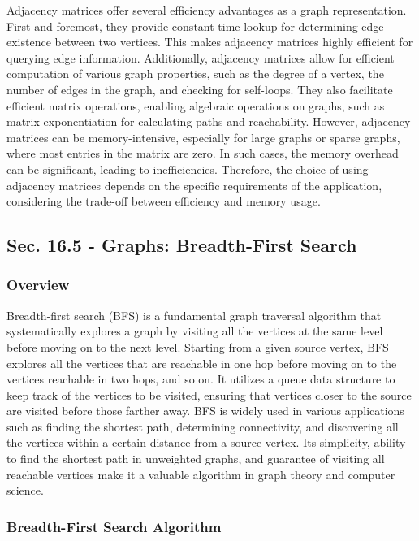 Adjacency matrices offer several efficiency advantages as a graph representation. First and foremost, they provide constant-time lookup for determining edge existence between two vertices. This makes adjacency matrices 
highly efficient for querying edge information. Additionally, adjacency matrices allow for efficient computation of various graph properties, such as the degree of a vertex, the number of edges in the graph, and checking 
for self-loops. They also facilitate efficient matrix operations, enabling algebraic operations on graphs, such as matrix exponentiation for calculating paths and reachability. However, adjacency matrices can be 
memory-intensive, especially for large graphs or sparse graphs, where most entries in the matrix are zero. In such cases, the memory overhead can be significant, leading to inefficiencies. Therefore, the choice of using 
adjacency matrices depends on the specific requirements of the application, considering the trade-off between efficiency and memory usage.

\subsection*{Sec. 16.5 - Graphs: Breadth-First Search}

\subsubsection{Overview}

Breadth-first search (BFS) is a fundamental graph traversal algorithm that systematically explores a graph by visiting all the vertices at the same level before moving on to the next level. Starting from a given source 
vertex, BFS explores all the vertices that are reachable in one hop before moving on to the vertices reachable in two hops, and so on. It utilizes a queue data structure to keep track of the vertices to be visited, ensuring 
that vertices closer to the source are visited before those farther away. BFS is widely used in various applications such as finding the shortest path, determining connectivity, and discovering all the vertices within a certain 
distance from a source vertex. Its simplicity, ability to find the shortest path in unweighted graphs, and guarantee of visiting all reachable vertices make it a valuable algorithm in graph theory and computer science.

\subsubsection{Breadth-First Search Algorithm}

